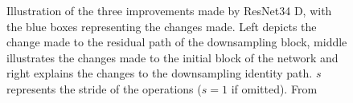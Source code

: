 \begin{figure}[htbp]
    \caption{Illustration of the three improvements made by ResNet34 D, with the blue boxes representing the changes made. Left depicts the change made to the residual path of the downsampling block, middle illustrates the changes made to the initial block of the network and right explains the changes to the downsampling identity path. $s$ represents the stride of the operations  ($s=1$ if omitted). From \cite{heBagTricksImage2018}}
    \label{fig:resnet34d}
\end{figure}


